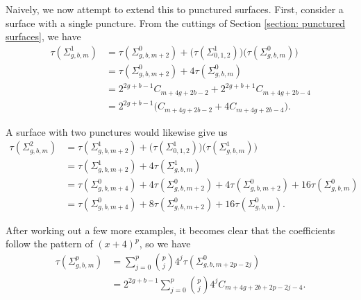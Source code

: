 \documentclass[reqno,12pt]{amsart}
\theoremstyle{definition}
\theoremstyle{remark}
\theoremstyle{remark}
\numberwithin{equation}{section}
\begin{document}
Naively, we now attempt to extend this to punctured surfaces. First, consider a surface with a single puncture. From the cuttings of Section \ref{section: punctured surfaces}, we have 
\begin{align*}
\tau (\Sigma_{g,b,m}^{1}) &= \tau (\Sigma_{g,b,m+2}^{0}) + \big(\tau (\Sigma_{0,1,2}^{1})\big)\big(\tau (\Sigma_{g,b,m}^{0})\big) \\
&= \tau (\Sigma_{g,b,m+2}^{0}) + 4 \tau (\Sigma_{g,b,m}^{0})\\
&= 2^{2g+b-1} C_{m + 4g + 2b - 2} + 2^{2g+b+1} C_{m + 4g + 2b - 4} \\
&= 2^{2g+b-1} \big( C_{m + 4g + 2b - 2} + 4 C_{m + 4g + 2b - 4} \big).
\end{align*}

A surface with two punctures would likewise give us 
\begin{align*}
\tau (\Sigma_{g,b,m}^{2}) &= \tau (\Sigma_{g,b,m+2}^{1}) + \big(\tau (\Sigma_{0,1,2}^{1})\big)\big(\tau (\Sigma_{g,b,m}^{1})\big) \\
&= \tau (\Sigma_{g,b,m+2}^{1}) + 4\tau (\Sigma_{g,b,m}^{1}) \\
&= \tau (\Sigma_{g,b,m+4}^{0}) + 4\tau (\Sigma_{g,b,m+2}^{0}) + 4\tau (\Sigma_{g,b,m+2}^{0}) + 16\tau (\Sigma_{g,b,m}^{0}) \\
&= \tau (\Sigma_{g,b,m+4}^{0}) + 8\tau (\Sigma_{g,b,m+2}^{0})+ 16\tau (\Sigma_{g,b,m}^{0}).
\end{align*}

After working out a few more examples, it becomes clear that the coefficients follow the pattern of $(x+4)^p$, so we have 
\begin{align*}
    \tau (\Sigma_{g,b,m}^{p}) &= \sum_{j=0}^p \binom{p}{j} 4^{j} \tau (\Sigma_{g,b,m+2p-2j}^{0}) \\
    &= 2^{2g+b-1} \sum_{j=0}^p \binom{p}{j} 4^{j} C_{m + 4g + 2b +2p - 2j- 4}. \tag{$\star \star$}
\end{align*}
\end{document}
